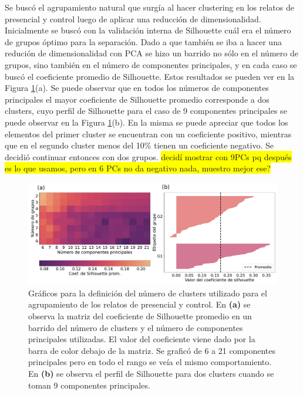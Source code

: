 Se buscó el agrupamiento natural que surgía al hacer clustering en los relatos de presencial y control luego de aplicar una reducción de dimensionalidad.
Inicialmente se buscó con la validación interna de Silhouette cuál era el número de grupos óptimo para la separación. Dado a que también se iba a hacer una redución de dimensionalidad con PCA se hizo un barrido no sólo en el número de grupos, sino también en el número de componentes principales, y en cada caso se buscó el coeficiente promedio de Silhouette. Estos resultados se pueden ver en la Figura \ref{fig:cap3_defk_controlpres}(a). Se puede observar que en todos los números de componentes principales el mayor coeficiente de Silhouette promedio corresponde a dos clusters, cuyo perfil de Silhouette para el caso de 9 componentes principales se puede observar en la Figura \ref{fig:cap3_defk_controlpres}(b). En la misma se puede apreciar que todos los elementos del primer cluster se encuentran con un coeficiente positivo, mientras que en el segundo cluster menos del 10$\%$ tienen un coeficiente negativo. Se decidió continuar entonces con dos grupos. \colorbox{yellow}{decidí mostrar con 9PCs pq después es lo que usamos, pero en 6 PCs no da negativo nada, muestro mejor ese?}

\begin{figure}[h]
    \centering
    \includegraphics[width = 15cm]{figures/ch03/PCA_clustering/Primer tiempo/silhouette2_pres_control_perfil9PCs.pdf} 
    \caption{Gráficos para la definición del número de clusters utilizado para el agrupamiento de los relatos de presencial y control. En \textbf{(a)} se observa la matriz del coeficiente de Silhouette promedio en un barrido del número de clusters y el número de componentes principales utilizadas. El valor del coeficiente viene dado por la barra de color debajo de la matriz. Se graficó de 6 a 21 componentes principales pero en todo el rango se veía el mismo comportamiento. En \textbf{(b)} se observa el perfil de Silhouette para dos clusters cuando se toman 9 componentes principales.}
\label{fig:cap3_defk_controlpres}
\end{figure}

